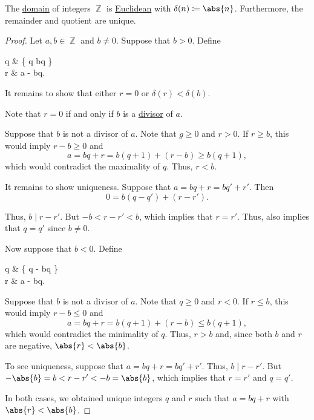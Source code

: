 \begin{proposition}\label{thm:integers_are_euclidean_domain}
  The \hyperref[def:semiring/integral_domain]{domain} of integers \( \BbbZ \) is \hyperref[def:semiring/euclidean_domain]{Euclidean} with \( \delta(n) \coloneqq \abs{n} \). Furthermore, the remainder and quotient are unique.
\end{proposition}
\begin{proof}
  Let \( a, b \in \BbbZ \) and \( b \neq 0 \). Suppose that \( b > 0 \). Define
  \begin{balign*}
    q & \coloneqq \max \{ q \in \BbbZ \colon bq \leq {} \} \\
    r & \coloneqq a - bq.
  \end{balign*}

  It remains to show that either \( r = 0 \) or \( \delta(r) < \delta(b) \).

  Note that \( r = 0 \) if and only if \( b \) is a \hyperref[def:commutative_ring_division]{divisor} of \( a \).

  Suppose that \( b \) is not a divisor of \( a \). Note that \( g \geq 0 \) and \( r > 0 \). If \( r \geq b \), this would imply \( r - b \geq 0 \) and
  \begin{equation*}
    a = bq + r = b(q + 1) + (r - b) \geq b(q + 1),
  \end{equation*}
  which would contradict the maximality of \( q \). Thus, \( r < b \).

  It remains to show uniqueness. Suppose that \( a = bq + r = bq' + r' \). Then
  \begin{equation*}
    0 = b(q - q') + (r - r').
  \end{equation*}

  Thus, \( b \mid r - r' \). But \( -b < r - r' < b \), which implies that \( r = r' \). Thus, also implies that \( q = q' \) since \( b \neq 0 \).

  Now suppose that \( b < 0 \). Define
  \begin{balign*}
    q & \coloneqq \min \{ q \in \BbbZ \colon - \leq bq \} \\
    r & \coloneqq a - bq.
  \end{balign*}

  Suppose that \( b \) is not a divisor of \( a \). Note that \( q \geq 0 \) and \( r < 0 \). If \( r \leq b \), this would imply \( r - b \leq 0 \) and
  \begin{equation*}
    a = bq + r = b(q + 1) + (r - b) \leq b(q + 1),
  \end{equation*}
  which would contradict the minimality of \( q \). Thus, \( r > b \) and, since both \( b \) and \( r \) are negative, \( \abs{r} < \abs{b} \).

  To see uniqueness, suppose that \( a = bq + r = bq' + r' \). Thus, \( b \mid r - r' \). But \( -\abs{b} = b < r - r' < -b = \abs{b} \), which implies that \( r = r' \) and \( q = q' \).

  In both cases, we obtained unique integers \( q \) and \( r \) such that \( a = bq + r \) with \( \abs{r} < \abs{b} \).
\end{proof}

